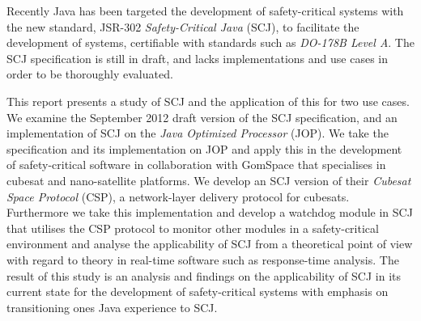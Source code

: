 Recently Java has been targeted the development of safety-critical systems with the new standard, JSR-302 \textit{Safety-Critical Java} (SCJ), to facilitate the development of systems, certifiable with standards such as \textit{DO-178B Level A}. The SCJ specification is still in draft, and lacks implementations and use cases in order to be thoroughly evaluated. 

This report presents a study of SCJ and the application of this for two use cases.
We examine the September 2012 draft version of the SCJ specification, and an implementation of SCJ on the \textit{Java Optimized Processor} (JOP). We take the specification and its implementation on JOP and apply this in the development of safety-critical software in collaboration with GomSpace that specialises in cubesat and nano-satellite platforms. We develop an SCJ version of their \textit{Cubesat Space Protocol} (CSP), a network-layer delivery protocol for cubesats. Furthermore we take this implementation and develop a watchdog module in SCJ that utilises the CSP protocol to monitor other modules in a safety-critical environment and analyse the applicability of SCJ from a theoretical point of view with regard to theory in real-time software such as response-time analysis. The result of this study is an analysis and findings on the applicability of SCJ in its current state for the development of safety-critical systems with emphasis on transitioning ones Java experience to SCJ.